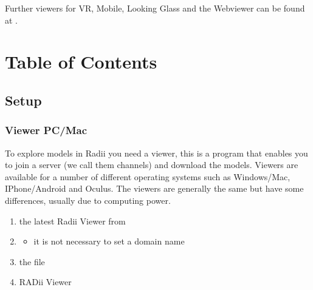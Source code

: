 \documentclass[letterpaper,10pt,english]{sphinxmanual}
\begin{document}
\sphinxAtStartPar
Further viewers for VR, Mobile, Looking Glass and the Webviewer can be found at .


\chapter{Table of Contents}
\label{\detokenize{index:table-of-contents}}
\sphinxstepscope


\section{Setup}
\label{\detokenize{tutorial/Setup/install_setup:setup}}\label{\detokenize{tutorial/Setup/install_setup::doc}}

\subsection{Viewer PC/Mac}
\label{\detokenize{tutorial/Setup/install_setup:viewer-pc-mac}}
\sphinxAtStartPar
To explore models in Radii you need a viewer, this is a program that enables you to join a server (we call them channels) and download the models.
Viewers are available for a number of different operating systems such as Windows/Mac, IPhone/Android and Oculus.
The viewers are generally the same but have some differences, usually due to computing power.

\noindent{}
\begin{enumerate}
%
\item {} 
\sphinxAtStartPar
{} the latest Radii Viewer from 

\item {} \begin{description}
\begin{itemize}
\item {} 
\sphinxAtStartPar
it is not necessary to set a domain name

\end{itemize}

\end{description}

\item {} 
\sphinxAtStartPar
{} the file

\item {} 
\sphinxAtStartPar
{} RADii Viewer

\end{enumerate}
\end{document}

